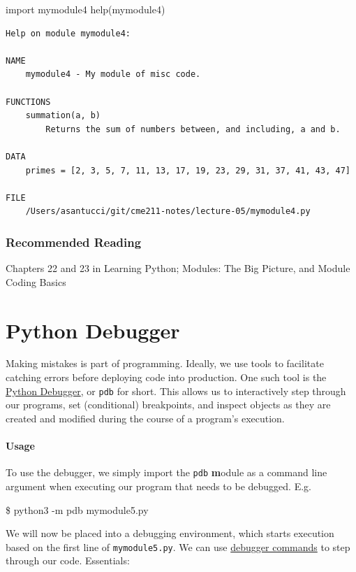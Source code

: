 \documentclass[12pt,letterpaper,twoside]{article}
\begin{document}
\begin{enumerate}
\begin{python}
import mymodule4
help(mymodule4)
\end{python}

{
\small
\begin{verbatim}
Help on module mymodule4:

NAME
    mymodule4 - My module of misc code.

FUNCTIONS
    summation(a, b)
        Returns the sum of numbers between, and including, a and b.

DATA
    primes = [2, 3, 5, 7, 11, 13, 17, 19, 23, 29, 31, 37, 41, 43, 47]

FILE
    /Users/asantucci/git/cme211-notes/lecture-05/mymodule4.py
\end{verbatim}
}

\subsubsection{Recommended Reading}
{ \small
  Chapters 22 and 23 in Learning Python; Modules: The Big Picture, and Module Coding Basics
}

\section{Python Debugger} Making mistakes is part of programming. Ideally, we use tools to facilitate 
catching errors before deploying code into production. One such tool is the \href{https://docs.python.org/3/library/pdb.html#debugger-commands}{Python Debugger}, or \texttt{pdb} for short. This allows us to interactively step through our programs, set (conditional) breakpoints, and inspect objects as they are created and modified during the course of a program's execution.

\paragraph{Usage} To use the debugger, we simply import the \texttt{pdb} \textbf{m}odule as a command line argument when executing our program that needs to be debugged. E.g.

\begin{shell}
\$ python3 -m pdb mymodule5.py
\end{shell}

We will now be placed into a debugging environment, which starts execution based
on the first line of \texttt{mymodule5.py}. We can use \href{https://docs.python.org/3/library/pdb.html#debugger-commands}{debugger commands} to step through our code. Essentials:


\end{enumerate}
\end{document}
